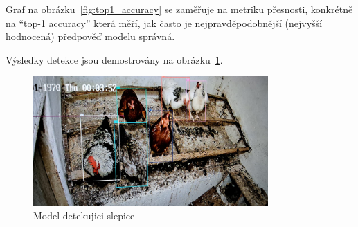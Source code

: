 Graf na obrázku~\ref{fig:top1_accuracy} se zaměřuje na metriku přesnosti, konkrétně na
``top-1 accuracy'' která měří, jak často je nejpravděpodobnější (nejvyšší hodnocená) předpověď modelu správná.

Výsledky detekce jsou demostrovány na obrázku~\ref{fig:detekce_slepic}.

\begin{figure}[htbp]
    \centering
    \includegraphics[width=0.8\textwidth]{img/detekce_slepic}
    \caption{Model detekujici slepice}
    \label{fig:detekce_slepic}
\end{figure}
